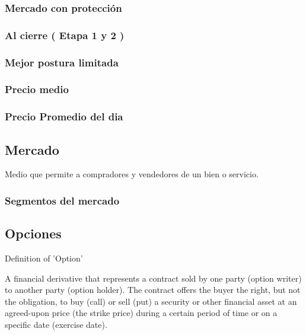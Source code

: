             \subsubsection{ Mercado con protecci\'on }
            
            \subsubsection{ Al cierre ( Etapa 1 y 2 ) }
            
            \subsubsection{ Mejor postura limitada }
            
            \subsubsection{ Precio medio }
            
            \subsubsection{ Precio Promedio del dia }
                
       \subsection{ Mercado }
        
        Medio que permite a compradores y vendedores de un bien o servicio.
        
            \subsubsection{ Segmentos del mercado }
            
            
        
        \subsection{ Opciones }
        
        Definition of 'Option'

        A financial derivative that represents a contract sold by one party (option writer) to another party (option holder). The contract offers the buyer the right, but not the obligation, to buy (call) or sell (put) a security or other financial asset at an agreed-upon price (the strike price) during a certain period of time or on a specific date (exercise date).

